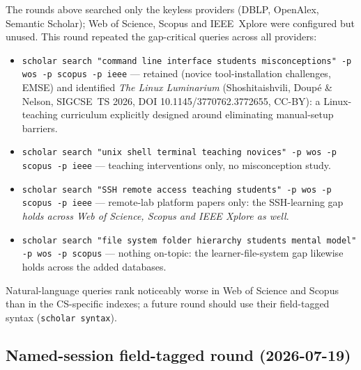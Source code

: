 The rounds above searched only the keyless providers (DBLP, OpenAlex,
Semantic Scholar); Web of Science, Scopus and IEEE~Xplore were configured
but unused.
This round repeated the gap-critical queries across all providers:
\begin{itemize}
  \item \texttt{scholar search "command line interface students
    misconceptions" -p wos -p scopus -p ieee} --- retained
    \autocite{Salerno2026ToolInstallation} (novice tool-installation
    challenges, EMSE) and identified \emph{The Linux Luminarium}
    (Shoshitaishvili, Doup\'e \& Nelson, SIGCSE~TS 2026, DOI
    10.1145/3770762.3772655, CC-BY): a Linux-teaching curriculum
    explicitly designed around eliminating manual-setup barriers.
  \item \texttt{scholar search "unix shell terminal teaching novices" -p
    wos -p scopus -p ieee} --- teaching interventions only, no
    misconception study.
  \item \texttt{scholar search "SSH remote access teaching students" -p
    wos -p scopus -p ieee} --- remote-lab platform papers only: the
    SSH-learning gap \emph{holds across Web of Science, Scopus and IEEE
    Xplore as well}.
  \item \texttt{scholar search "file system folder hierarchy students
    mental model" -p wos -p scopus} --- nothing on-topic: the
    learner-file-system gap likewise holds across the added databases.
\end{itemize}
Natural-language queries rank noticeably worse in Web of Science and
Scopus than in the CS-specific indexes; a future round should use their
field-tagged syntax (\texttt{scholar syntax}).

\subsection{Named-session field-tagged round (2026-07-19)}

